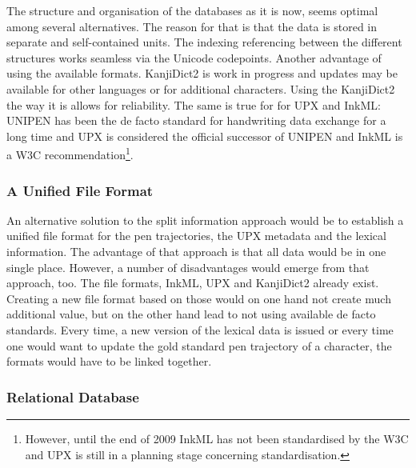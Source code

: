 The structure and organisation of the databases as it is now, seems optimal
among several alternatives. The reason for that is that the data is stored in
separate and self-contained units. The indexing referencing between the different
structures works seamless via the Unicode codepoints.
Another advantage of using the available formats. KanjiDict2 is work in
progress and updates may be available for other languages or for additional 
characters. Using the KanjiDict2 the way it is allows for reliability.
The same is true for for UPX and InkML: UNIPEN has been the de facto standard
for handwriting data exchange for a long time and UPX is considered the
official successor of UNIPEN and InkML is a W3C recommendation\footnote{
However, until the end of 2009 InkML has not been standardised by the W3C and
UPX is still in a planning stage concerning standardisation.}.

\subsubsection{A Unified File Format}
\label{sec:hwre:aunifiedfileformat}

An alternative solution to the split information approach would be to
establish a unified file format for the pen trajectories, the UPX metadata
and the lexical information. 
The advantage of that approach is that all data would be in one single 
place. However, a number of disadvantages would emerge from that approach, too.
The file formats, InkML, UPX and KanjiDict2 already exist.
Creating a new file format based on those would on one hand not create much 
additional value, but on the other hand lead to not using available de facto
standards. Every time, a new version of the lexical data is issued or every
time one would want to update the gold standard pen trajectory of a character,
the formats would have to be linked together. 

\subsubsection{Relational Database}
\label{sec:hwre:relationaldatabase}

